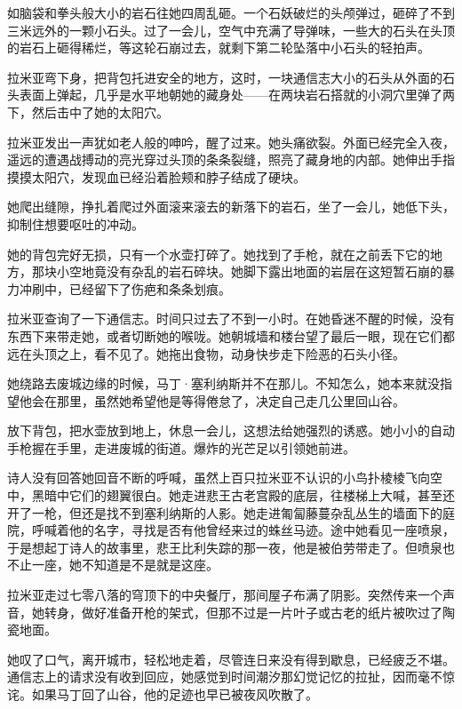 \documentclass[AutoFakeBold=true]{book}
\begin{document}
如脑袋和拳头般大小的岩石往她四周乱砸。一个石妖破烂的头颅弹过，砸碎了不到三米远外的一颗小石头。过了一会儿，空气中充满了导弹味，一些大的石头在头顶的岩石上砸得稀烂，等这轮石崩过去，就剩下第二轮坠落中小石头的轻拍声。

拉米亚弯下身，把背包托进安全的地方，这时，一块通信志大小的石头从外面的石头表面上弹起，几乎是水平地朝她的藏身处——在两块岩石搭就的小洞穴里弹了两下，然后击中了她的太阳穴。

\vspace*{1em}

拉米亚发出一声犹如老人般的呻吟，醒了过来。她头痛欲裂。外面已经完全入夜，遥远的遭遇战搏动的亮光穿过头顶的条条裂缝，照亮了藏身地的内部。她伸出手指摸摸太阳穴，发现血已经沿着脸颊和脖子结成了硬块。

她爬出缝隙，挣扎着爬过外面滚来滚去的新落下的岩石，坐了一会儿，她低下头，抑制住想要呕吐的冲动。

她的背包完好无损，只有一个水壶打碎了。她找到了手枪，就在之前丢下它的地方，那块小空地竟没有杂乱的岩石碎块。她脚下露出地面的岩层在这短暂石崩的暴力冲刷中，已经留下了伤疤和条条划痕。

拉米亚查询了一下通信志。时间只过去了不到一小时。在她昏迷不醒的时候，没有东西下来带走她，或者切断她的喉咙。她朝城墙和楼台望了最后一眼，现在它们都远在头顶之上，看不见了。她拖出食物，动身快步走下险恶的石头小径。

\vspace*{1em}

她绕路去废城边缘的时候，马丁·塞利纳斯并不在那儿。不知怎么，她本来就没指望他会在那里，虽然她希望他是等得倦怠了，决定自己走几公里回山谷。

放下背包，把水壶放到地上，休息一会儿，这想法给她强烈的诱惑。她小小的自动手枪握在手里，走进废城的街道。爆炸的光芒足以引领她前进。

诗人没有回答她回音不断的呼喊，虽然上百只拉米亚不认识的小鸟扑棱棱飞向空中，黑暗中它们的翅翼很白。她走进悲王古老宫殿的底层，往楼梯上大喊，甚至还开了一枪，但还是找不到塞利纳斯的人影。她走进匍匐藤蔓杂乱丛生的墙面下的庭院，呼喊着他的名字，寻找是否有他曾经来过的蛛丝马迹。途中她看见一座喷泉，于是想起丁诗人的故事里，悲王比利失踪的那一夜，他是被伯劳带走了。但喷泉也不止一座，她不知道是不是就是这座。

拉米亚走过七零八落的穹顶下的中央餐厅，那间屋子布满了阴影。突然传来一个声音，她转身，做好准备开枪的架式，但那不过是一片叶子或古老的纸片被吹过了陶瓷地面。

她叹了口气，离开城市，轻松地走着，尽管连日来没有得到歇息，已经疲乏不堪。通信志上的请求没有收到回应，她感觉到时间潮汐那{\kaishu 幻觉记忆}的拉扯，因而毫不惊诧。如果马丁回了山谷，他的足迹也早已被夜风吹散了。
\end{document}
